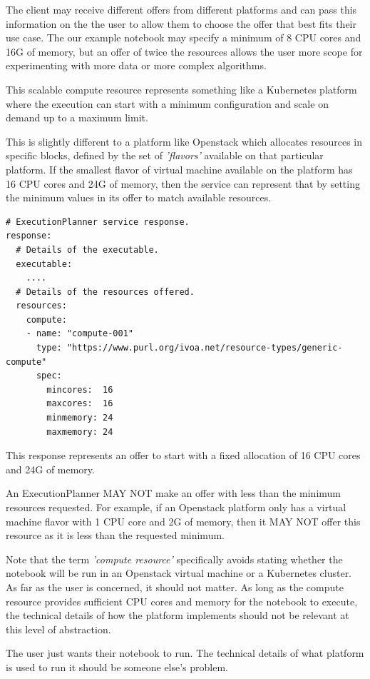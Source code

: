 \documentclass[11pt,a4paper]{ivoa}
\newcommand{\execplanner} {ExecutionPlanner}
\newcommand{\openstack} {Openstack}
\newcommand{\kubernetes} {Kubernetes}
\newcommand{\cpu} {CPU}
\newcommand{\scalable} {scalable}
\begin{document}
The client may receive different offers from different platforms and can pass this information
on the the user to allow them to choose the offer that best fits their use case.
The our example notebook may specify a minimum of 8 \cpu{} cores and 16G of memory,
but an offer of twice the resources allows the user more scope for experimenting with
more data or more complex algorithms.

This \scalable{} compute resource represents something like a \kubernetes{} platform where the
execution can start with a minimum configuration and scale on demand up to a maximum limit.

This is slightly different to a platform like \openstack{} which allocates resources
in specific blocks, defined by the set of \textit{'flavors'} available on that particular platform.
If the smallest flavor of virtual machine available on the platform has 16 \cpu{} cores and 24G of memory,
then the service can represent that by setting the minimum values in its offer to match available resources.

\begin{lstlisting}[]
# ExecutionPlanner service response.
response:
  # Details of the executable.
  executable:
    ....
  # Details of the resources offered.
  resources:
    compute:
    - name: "compute-001"
      type: "https://www.purl.org/ivoa.net/resource-types/generic-compute"
      spec:
        mincores:  16
        maxcores:  16
        minmemory: 24
        maxmemory: 24
\end{lstlisting}

This response represents an offer to start with a fixed allocation of 16 \cpu{} cores and 24G of memory.

An \execplanner{} MAY NOT make an offer with less than the minimum resources requested.
For example, if an \openstack{} platform only has a virtual machine flavor with 1 \cpu{} core and 2G of memory,
then it MAY NOT offer this resource as it is less than the requested minimum.

Note that the term \textit{'compute resource'} specifically avoids stating whether the
notebook will be run in an \openstack{} virtual machine or a \kubernetes{} cluster.
As far as the user is concerned, it should not matter. As long as the compute resource provides
sufficient \cpu{} cores and memory for the notebook to execute, the technical details of how the
platform implements should not be relevant at this level of abstraction.

The user just wants their notebook to run. The technical details of what platform is used to
run it should be someone else's problem.
\end{document}
